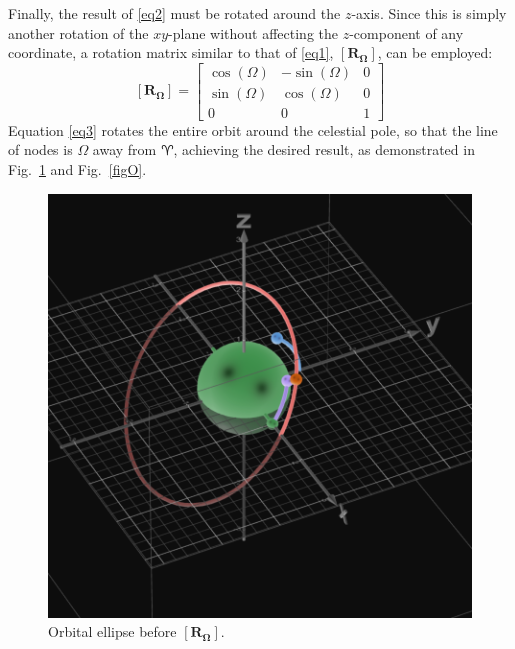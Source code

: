 \documentclass[conference]{IEEEtran}
\begin{document}
			Finally, the result of \eqref{eq2} must be rotated around the \( z \)-axis. Since this is simply another rotation of the \( xy \)-plane without affecting the \( z \)-component of any coordinate, a rotation matrix similar to that of \eqref{eq1}, \( \bm{\left[R_{\Omega}\right]} \), can be employed:
			\begin{equation}
				\bm{\left[R_{\Omega}\right]}=
				\begin{bmatrix}
					\cos{\left(\Omega\right)} & -\sin{\left(\Omega\right)} & 0\\
					\sin{\left(\Omega\right)} & \cos{\left(\Omega\right)} & 0\\
					0 & 0 & 1
				\end{bmatrix}
				\label{eq3}
			\end{equation}
			Equation \eqref{eq3} rotates the entire orbit around the celestial pole, so that the line of nodes is \( \Omega \) away from \( \aries \), achieving the desired result, as demonstrated in Fig.~\ref{figN} and Fig.~\ref{figO}.

			\begin{figure}[hbtp]
				\begin{center}
					\includegraphics[width=0.8\columnwidth]{5.png}
				\end{center}
				\caption{Orbital ellipse before \( \bm{\left[R_{\Omega}\right]} \).}
				\label{figN}
			\end{figure}
\end{document}
